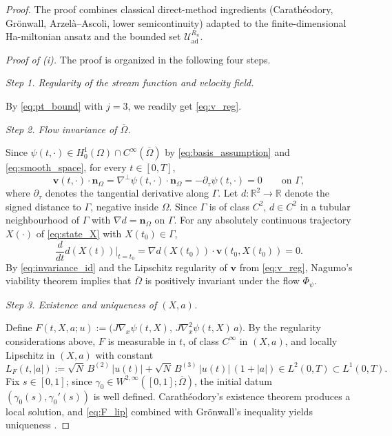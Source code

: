 \documentclass[12pt, reqno]{amsart}
\theoremstyle{plain}
\theoremstyle{definition}
\numberwithin{equation}{section}
\numberwithin{figure}{section}
\numberwithin{algorithm}{section}
\begin{document}
\begin{proof}
The proof combines classical direct-method ingredients (Carath\'eodory, Gr\"onwall, Arzel\`a--Ascoli, lower semicontinuity) adapted to the finite-dimensional Ha-miltonian ansatz and the bounded set $\mathcal U_{\mathrm{ad}}^{R_u}$.

\noindent\textit{Proof of \textup{(i)}.}
The proof is organized in the following four steps.

\vskip 5pt
\noindent\textit{Step 1. Regularity of the stream function and velocity field.}

By \eqref{eq:pt_bound} with $j=3$, we readily get \eqref{eq:v_reg}.

\vskip 5pt
\noindent\textit{Step 2. Flow invariance of $\overline\Omega$.}

Since $\psi(t,\cdot)\in H_0^1(\Omega)\cap C^\infty(\overline\Omega)$ by \eqref{eq:basis_assumption} and \eqref{eq:smooth_space}, for every $t\in[0,T]$,
\begin{equation*}
\mathbf v(t,\cdot)\cdot\mathbf n_\Omega=\nabla^\perp\psi(t,\cdot)\cdot\mathbf n_\Omega=-\partial_\tau\psi(t,\cdot)=0\qquad\text{on }\Gamma,
\end{equation*}
where $\partial_\tau$ denotes the tangential derivative along $\Gamma$. Let $d:\mathbb R^2\to\mathbb R$ denote the signed distance to $\Gamma$, negative inside $\Omega$. Since $\Gamma$ is of class $C^2$, $d\in C^2$ in a tubular neighbourhood of $\Gamma$ with $\nabla d=\mathbf n_\Omega$ on $\Gamma$. For any absolutely continuous trajectory $X(\cdot)$ of \eqref{eq:state_X} with $X(t_0)\in\Gamma$,
\begin{equation}\label{eq:invariance_id}
\frac{d}{dt}d(X(t))\big|_{t=t_0}=\nabla d(X(t_0))\cdot\mathbf v(t_0,X(t_0))=0.
\end{equation}
By \eqref{eq:invariance_id} and the Lipschitz regularity of $\mathbf v$ from \eqref{eq:v_reg}, Nagumo's viability theorem \cite[Ch.~V, Thm.~4.1]{hartman2002ode} implies that $\overline\Omega$ is positively invariant under the flow $\Phi_\psi$.

\vskip 5pt
\noindent\textit{Step 3. Existence and uniqueness of $(X,a)$.}

Define $F(t,X,a;u):=\bigl(J\nabla_x\psi(t,X),\,J\nabla_x^2\psi(t,X)\,a\bigr)$. By the regularity considerations above, $F$ is measurable in $t$, of class $C^\infty$ in $(X,a)$, and locally Lipschitz in $(X,a)$ with constant
\begin{equation}\label{eq:F_lip}
L_F(t,|a|):=\sqrt N\,B^{(2)}\,|u(t)|+\sqrt N\,B^{(3)}\,|u(t)|\,(1+|a|)\in L^2(0,T)\subset L^1(0,T).
\end{equation}
Fix $s\in[0,1]$; since $\gamma_0\in W^{2,\infty}([0,1];\overline\Omega)$, the initial datum $(\gamma_0(s),\gamma_0'(s))$ is well defined. Carath\'eodory's existence theorem \cite[Ch.~II, Thm.~1.1]{hartman2002ode} produces a local solution, and \eqref{eq:F_lip} combined with Gr\"onwall's inequality yields uniqueness \cite[Ch.~II, Thm.~2.1]{hartman2002ode}.


\end{proof}
\end{document}
